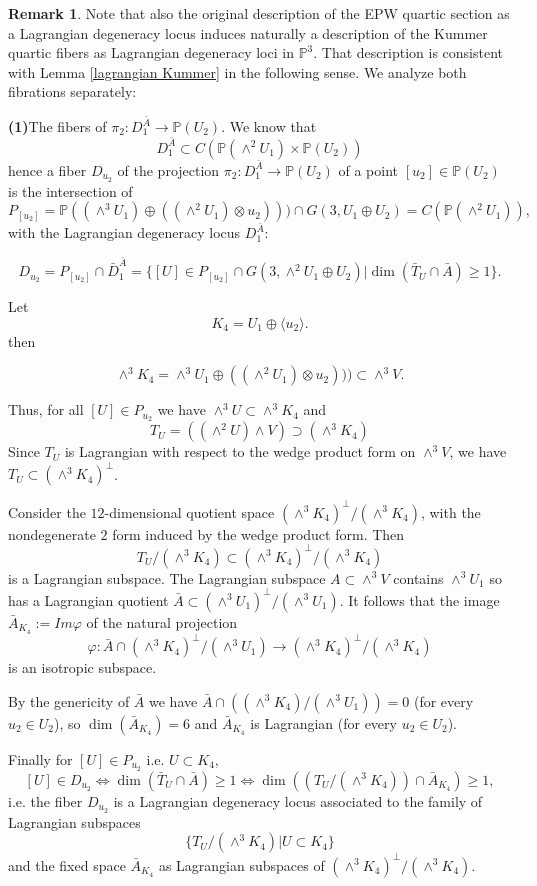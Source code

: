 \documentclass[a4paper,11pt]{amsart}
\theoremstyle{definition}
\newtheorem{rem}[thm]{Remark}
\numberwithin{equation}{section}
\numberwithin{equation}{section} \theoremstyle{definition}
\begin{document}
\begin{rem} Note that also the original description of the EPW quartic section as a Lagrangian degeneracy locus induces naturally a description of the Kummer quartic fibers as Lagrangian degeneracy loci in $\mathbb{P}^3$. That description is consistent with Lemma \ref{lagrangian Kummer} in the following sense.  We analyze both fibrations separately:

\textbf{(1)}The fibers of $\pi_2: D_1^{\bar{A}} \to {{\mathbb{P}}}(U_2)$.
We know that 
\[
D_1^{\bar{A}} \subset C(\mathbb{P}(\wedge^2 U_1)\times \mathbb{P}(U_2))
\]
 hence a fiber $D_{u_2}$  of the projection $\pi_2: D_1^{\bar{A}} \to {{\mathbb{P}}}(U_2)$ of a point $[u_2]\in {{\mathbb{P}}}(U_2)$ is the intersection of 
 \[
 P_{[u_2]}={{\mathbb{P}}}((\wedge^3 U_1) \oplus ((\wedge^2 U_1)\otimes u_2)))\cap G(3,U_1\oplus U_2)=C(\mathbb{P}(\wedge^2 U_1)),
 \]
with the Lagrangian degeneracy locus $D_1^{\bar{A}}$: 

\[
D_{u_2}=P_{[u_2]}\cap\bar{D}_1^{\bar{A}}=\{[U]\in P_{[u_2]}\cap G(3,\wedge^2 U_1\oplus U_2)| \dim(\bar{T}_U\cap \bar{A})\geq 1\}. 
\]

Let 
\[
K_4=U_1\oplus\langle u_2\rangle.
\]
 then 

\[
\wedge ^3K_4=\wedge^3 U_1 \oplus ((\wedge^2 U_1)\otimes u_2)))\subset \wedge^3 V.
\]

Thus, for all $[U]\in P_{u_2}$ we have $\wedge^3U\subset \wedge ^3K_4$ and 
$$T_U=((\wedge^2 U )\wedge V )\supset (\wedge^3 K_4)$$
Since $T_U$ is Lagrangian with respect to the wedge product form on $\wedge^3V$, we have $T_U\subset (\wedge^3 K_4)^{\perp}$. 

Consider the $12$-dimensional quotient space $(\wedge^3 K_4)^\perp /(\wedge^3 K_4)$, with the nondegenerate $2$ form induced by the wedge product form. Then 
$$T_{U}/(\wedge^3 K_4) \subset (\wedge^3 K_4)^\perp /(\wedge^3 K_4)$$ is a Lagrangian subspace.
The Lagrangian subspace $A\subset \wedge^3 V$ contains $\wedge^3 U_1$ so has a Lagrangian quotient $\bar{A}\subset (\wedge^3 U_1)^{\perp}/(\wedge^3 U_1)$. It follows that the image $\bar{A}_{K_4}:= Im \varphi $ of the natural projection 
$$\varphi: \bar{A}\cap (\wedge^3 K_4)^{\perp}/(\wedge^3 U_1) \to (\wedge^3 K_4)^{\perp}/(\wedge^3 K_4)$$
is an isotropic subspace.  

By the genericity of $\bar{A}$ we have $\bar{A}\cap  ((\wedge^3 K_4)/(\wedge^3 U_1))=0$ (for every $u_2\in U_2$), so $\dim (\bar{A}_{K_4})=6$ and $\bar{A}_{K_4}$ is Lagrangian (for every $u_2\in U_2$). 

Finally for $[U]\in P_{u_2}$ i.e. $U\subset K_4$,
\[
[U]\in D_{u_2}\iff \dim(\bar{T}_U\cap \bar{A})\geq 1 \iff \dim((T_U/(\wedge^3 K_4))\cap \bar{A}_{K_4})\geq 1,
\]
i.e. the fiber $D_{u_2}$ is a Lagrangian degeneracy locus associated to the family of Lagrangian subspaces 
\[
\{T_U/(\wedge^3 K_4)|U\subset K_4\}
\]
and the fixed space $\bar{A}_{K_4}$ as Lagrangian subspaces of 
$(\wedge^3 K_4)^{\perp}/(\wedge^3 K_4)$.


\end{rem}
\end{document}
